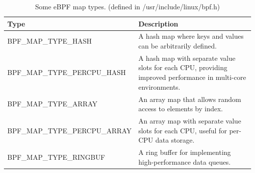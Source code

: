 \begin{table}[H]
    \centering
    \begin{tabular}{L{7cm}L{7cm}}
        \toprule
            Type & Description \\
        \midrule
            BPF\_MAP\_TYPE\_HASH & A hash map where keys and values can be arbitrarily defined. \\
        \midrule
            BPF\_MAP\_TYPE\_PERCPU\_HASH & A hash map with separate value slots for each CPU, providing improved performance in multi-core environments. \\
        \midrule
            BPF\_MAP\_TYPE\_ARRAY & An array map that allows random access to elements by index. \\
        \midrule
            BPF\_MAP\_TYPE\_PERCPU\_ARRAY & An array map with separate value slots for each CPU, useful for per-CPU data storage. \\
        \midrule
            BPF\_MAP\_TYPE\_RINGBUF & A ring buffer for implementing high-performance data queues. \\
        \bottomrule
    \end{tabular}
    \caption[Subset of eBPF map types]{Some eBPF map types. (defined in /usr/include/linux/bpf.h)}\label{tab:ebpf-map-types}
\end{table}

